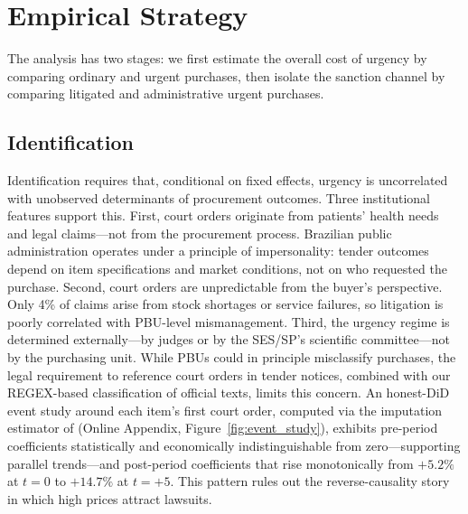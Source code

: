 \section{Empirical Strategy}
\label{sec:empirical}

The analysis has two stages: we first estimate the overall cost of urgency by comparing ordinary and urgent purchases, then isolate the sanction channel by comparing litigated and administrative urgent purchases.

\subsection{Identification}

Identification requires that, conditional on fixed effects, urgency is uncorrelated with unobserved determinants of procurement outcomes. Three institutional features support this. First, court orders originate from patients' health needs and legal claims---not from the procurement process. Brazilian public administration operates under a principle of impersonality: tender outcomes depend on item specifications and market conditions, not on who requested the purchase. Second, court orders are unpredictable from the buyer's perspective. Only 4\% of claims arise from stock shortages or service failures, so litigation is poorly correlated with PBU-level mismanagement. Third, the urgency regime is determined externally---by judges or by the SES/SP's scientific committee---not by the purchasing unit. While PBUs could in principle misclassify purchases, the legal requirement to reference court orders in tender notices, combined with our REGEX-based classification of official texts, limits this concern. An honest-DiD event study around each item's first court order, computed via the imputation estimator of \citet{borusyak2024revisiting} (Online Appendix, Figure~\ref{fig:event_study}), exhibits pre-period coefficients statistically and economically indistinguishable from zero---supporting parallel trends---and post-period coefficients that rise monotonically from $+5.2\%$ at $t=0$ to $+14.7\%$ at $t=+5$. This pattern rules out the reverse-causality story in which high prices attract lawsuits.

